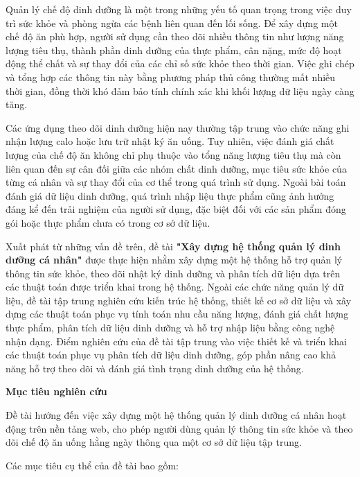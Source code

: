 \documentclass[12pt, a4paper]{report}
\begin{document}
Quản lý chế độ dinh dưỡng là một trong những yếu tố quan trọng trong việc duy trì sức khỏe và phòng ngừa các bệnh liên quan đến lối sống. Để xây dựng một chế độ ăn phù hợp, người sử dụng cần theo dõi nhiều thông tin như lượng năng lượng tiêu thụ, thành phần dinh dưỡng của thực phẩm, cân nặng, mức độ hoạt động thể chất và sự thay đổi của các chỉ số sức khỏe theo thời gian. Việc ghi chép và tổng hợp các thông tin này bằng phương pháp thủ công thường mất nhiều thời gian, đồng thời khó đảm bảo tính chính xác khi khối lượng dữ liệu ngày càng tăng.

Các ứng dụng theo dõi dinh dưỡng hiện nay thường tập trung vào chức năng ghi nhận lượng calo hoặc lưu trữ nhật ký ăn uống. Tuy nhiên, việc đánh giá chất lượng của chế độ ăn không chỉ phụ thuộc vào tổng năng lượng tiêu thụ mà còn liên quan đến sự cân đối giữa các nhóm chất dinh dưỡng, mục tiêu sức khỏe của từng cá nhân và sự thay đổi của cơ thể trong quá trình sử dụng. Ngoài bài toán đánh giá dữ liệu dinh dưỡng, quá trình nhập liệu thực phẩm cũng ảnh hưởng đáng kể đến trải nghiệm của người sử dụng, đặc biệt đối với các sản phẩm đóng gói hoặc thực phẩm chưa có trong cơ sở dữ liệu.

Xuất phát từ những vấn đề trên, đề tài \textbf{"Xây dựng hệ thống quản lý dinh dưỡng cá nhân"} được thực hiện nhằm xây dựng một hệ thống hỗ trợ quản lý thông tin sức khỏe, theo dõi nhật ký dinh dưỡng và phân tích dữ liệu dựa trên các thuật toán được triển khai trong hệ thống. Ngoài các chức năng quản lý dữ liệu, đề tài tập trung nghiên cứu kiến trúc hệ thống, thiết kế cơ sở dữ liệu và xây dựng các thuật toán phục vụ tính toán nhu cầu năng lượng, đánh giá chất lượng thực phẩm, phân tích dữ liệu dinh dưỡng và hỗ trợ nhập liệu bằng công nghệ nhận dạng. Điểm nghiên cứu của đề tài tập trung vào việc thiết kế và triển khai các thuật toán phục vụ phân tích dữ liệu dinh dưỡng, góp phần nâng cao khả năng hỗ trợ theo dõi và đánh giá tình trạng dinh dưỡng của hệ thống.

\textbf{Mục tiêu nghiên cứu}

Đề tài hướng đến việc xây dựng một hệ thống quản lý dinh dưỡng cá nhân hoạt động trên nền tảng web, cho phép người dùng quản lý thông tin sức khỏe và theo dõi chế độ ăn uống hằng ngày thông qua một cơ sở dữ liệu tập trung.

Các mục tiêu cụ thể của đề tài bao gồm:
\end{document}
